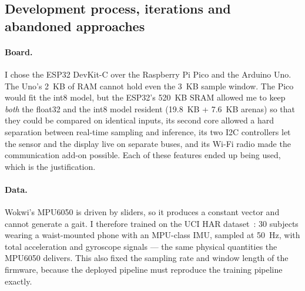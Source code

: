 \documentclass[10pt,a4paper]{article}
\begin{document}
\subsection{Development process, iterations and abandoned approaches}\label{sec:iter}

\paragraph{Board.} I chose the ESP32 DevKit-C over the Raspberry Pi Pico and the Arduino Uno. The Uno's \SI{2}{KB} of RAM cannot hold even the \SI{3}{KB} sample window. The Pico would fit the int8 model, but the ESP32's \SI{520}{KB} SRAM allowed me to keep \emph{both} the float32 and the int8 model resident (\SI{19.8}{KB} + \SI{7.6}{KB} arenas) so that they could be compared on identical inputs, its second core allowed a hard separation between real-time sampling and inference, its two I2C controllers let the sensor and the display live on separate buses, and its Wi-Fi radio made the communication add-on possible. Each of these features ended up being used, which is the justification.

\paragraph{Data.} Wokwi's MPU6050 is driven by sliders, so it produces a constant vector and cannot generate a gait. I therefore trained on the UCI HAR dataset~\cite{anguita2013}: 30 subjects wearing a waist-mounted phone with an MPU-class IMU, sampled at \SI{50}{\hertz}, with total acceleration and gyroscope signals --- the same physical quantities the MPU6050 delivers. This also fixed the sampling rate and window length of the firmware, because the deployed pipeline must reproduce the training pipeline exactly.
\end{document}
